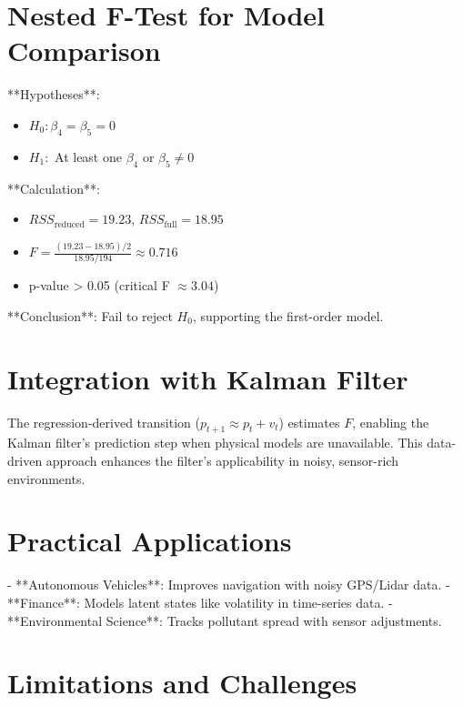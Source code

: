 \documentclass[12pt]{article}
\begin{document}
\section{Nested F-Test for Model Comparison}
\label{sec:nested_f_test}

**Hypotheses**:
\begin{itemize}
    \item \( H_0: \beta_4 = \beta_5 = 0 \)
    \item \( H_1: \) At least one \( \beta_4 \) or \( \beta_5 \neq 0 \)
\end{itemize}

**Calculation**:
\begin{itemize}
    \item \( RSS_{\text{reduced}} = 19.23 \), \( RSS_{\text{full}} = 18.95 \)
    \item \( F = \frac{(19.23 - 18.95) / 2}{18.95 / 194} \approx 0.716 \)
    \item p-value > 0.05 (critical F \(\approx 3.04\))
\end{itemize}

**Conclusion**: Fail to reject \( H_0 \), supporting the first-order model.

\section{Integration with Kalman Filter}
\label{sec:integration_kalman}

The regression-derived transition (\( p_{t+1} \approx p_t + v_t \)) estimates \( F \), enabling the Kalman filter’s prediction step when physical models are unavailable. This data-driven approach enhances the filter’s applicability in noisy, sensor-rich environments.

\section{Practical Applications}
\label{sec:practical_applications}

- **Autonomous Vehicles**: Improves navigation with noisy GPS/Lidar data.
- **Finance**: Models latent states like volatility in time-series data.
- **Environmental Science**: Tracks pollutant spread with sensor adjustments.

\section{Limitations and Challenges}
\label{sec:limitations_challenges}
\end{document}
